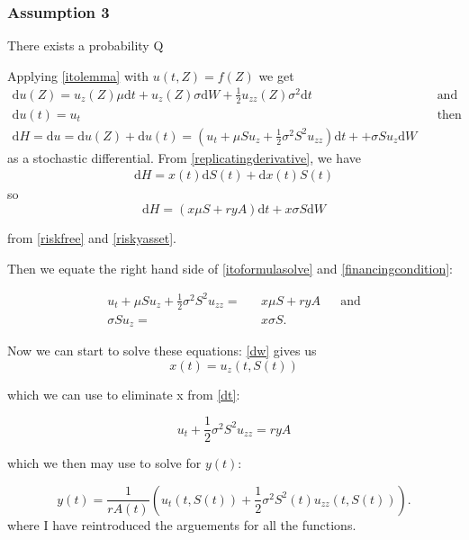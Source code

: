 \documentclass[11pt]{article} %
\begin{document}
\subsubsection{Assumption 3}
There exists a probability Q


Applying \ref{itolemma} with $u(t,Z) = f(Z)$ we get   
\begin{align}\label{itoformulasolve}
    \mathrm{d}u(Z)  = u_z(Z)\mu \mathrm{d}t + u_z(Z)\sigma \mathrm{d}W + \frac{1}{2}
    u_{zz}(Z) \sigma^2 \mathrm{d}t&& \text{and} \\
    \mathrm{d}u(t) = u_t &&\text{then} \\
    \mathrm{d}H =\mathrm{d}u = \mathrm{d}u(Z) +\mathrm{d}u(t) =   (u_t + \mu S u_z + \frac{1}{2} 
    \sigma^2 S^2 u_{zz})\mathrm{d}t + +\sigma S u_z \mathrm{d}W
\end{align}
as a stochastic differential.
From \ref{replicatingderivative}, we have
\begin{align}
    \mathrm{d}H = x(t)\mathrm{d}S(t) +\mathrm{d}x(t)S(t) 
\end{align}
so
\begin{equation}\label{financingcondition}
    \mathrm{d}H = (x\mu S + ryA)\mathrm{d}t + x \sigma S \mathrm{d}W 
\end{equation}

from \ref{riskfree} and \ref{riskyasset}.

Then we equate the right hand side of \ref{itoformulasolve} and \ref{financingcondition}:

\begin{align}\label{dt}
    u_t + \mu S u_z + \frac{1}{2} \sigma^2 S^2 u_{zz}  = &&x\mu S + ryA &&\text{and} \\
    \sigma Su_z =&& x\sigma S.\label{dw}
\end{align}

Now we can start to solve these equations: \ref{dw} gives us
\begin{equation}
    x(t) = u_z(t,S(t))
\end{equation}

which we can use to eliminate x from \ref{dt}:

\begin{equation}
    u_t + \frac{1}{2}\sigma ^2 S^2u_{zz} = ryA
\end{equation}

which we then may use to solve for $y(t)$:

\begin{equation}
    y(t) = \frac{1}{rA(t)}(u_t(t,S(t)) + \frac{1}{2} \sigma^2S^2(t)u_{zz}(t,S(t)) ).
\end{equation}
where I have reintroduced the arguements for all the functions.
\end{document}
